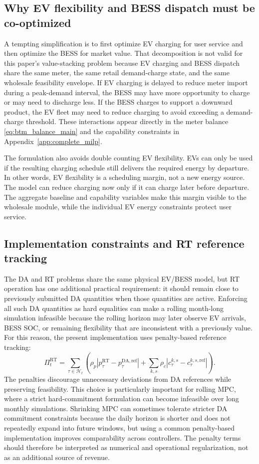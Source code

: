 \documentclass[final,5p,times]{elsarticle}
\newcommand{\DA}{\mathrm{DA}}
\newcommand{\RT}{\mathrm{RT}}
\newcommand{\calH}{\mathcal{H}}
\begin{document}
\subsection{Why EV flexibility and BESS dispatch must be co-optimized}
A tempting simplification is to first optimize EV charging for user service and then optimize the BESS for market value. That decomposition is not valid for this paper's value-stacking problem because EV charging and BESS dispatch share the same meter, the same retail demand-charge state, and the same wholesale feasibility envelope. If EV charging is delayed to reduce meter import during a peak-demand interval, the BESS may have more opportunity to charge or may need to discharge less. If the BESS charges to support a downward product, the EV fleet may need to reduce charging to avoid exceeding a demand-charge threshold. These interactions appear directly in the meter balance \eqref{eq:btm_balance_main} and the capability constraints in Appendix~\ref{app:complete_milp}.

The formulation also avoids double counting EV flexibility. EVs can only be used if the resulting charging schedule still delivers the required energy by departure. In other words, EV flexibility is a scheduling margin, not a new energy source. The model can reduce charging now only if it can charge later before departure. The aggregate baseline and capability variables make this margin visible to the wholesale module, while the individual EV energy constraints protect user service.

\subsection{Implementation constraints and RT reference tracking}
The DA and RT problems share the same physical EV/BESS model, but RT operation has one additional practical requirement: it should remain close to previously submitted DA quantities when those quantities are active. Enforcing all such DA quantities as hard equalities can make a rolling month-long simulation infeasible because the rolling horizon may later observe EV arrivals, BESS SOC, or remaining flexibility that are inconsistent with a previously value. For this reason, the present implementation uses penalty-based reference tracking:
\begin{equation}
\Pi_t^{\RT}
=
\sum_{\tau\in\calH_t}
\left(
\rho_p |p_{\tau}^{\RT}-p_{\tau}^{\DA,\mathrm{ref}}|
+
\sum_{k,s}\rho_c |c_{\tau}^{k,s}-c_{\tau}^{k,s,\mathrm{ref}}|
\right).
\end{equation}
The penalties discourage unnecessary deviations from DA references while preserving feasibility. This choice is particularly important for rolling MPC, where a strict hard-commitment formulation can become infeasible over long monthly simulations. Shrinking MPC can sometimes tolerate stricter DA commitment constraints because the daily horizon is shorter and does not repeatedly expand into future windows, but using a common penalty-based implementation improves comparability across controllers. The penalty terms should therefore be interpreted as numerical and operational regularization, not as an additional source of revenue.
\end{document}
